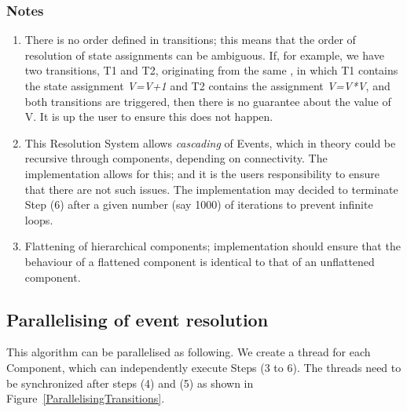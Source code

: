 \documentclass[draftspec]{ninemlspec}
\newcommand{\Regime}{\defRef{\textbf{\class{Regime}}\xspace}{sec:Regime}}
\begin{document}
\subsubsection{Notes}

\begin{enumerate}
\item  There is no order defined in transitions; this means
that the order of resolution of state assignments can be ambiguous. If, for
example, we have two transitions, T1 and T2, originating from the same \Regime,
in which T1 contains the state assignment \textsl{V=V+1} and T2 contains the
assignment \textsl{V=V*V}, and both transitions are triggered, then there is no
guarantee about the value of V. It is up the user to ensure this does not
happen.

\item This Resolution System allows \emph{cascading} of Events, which in theory
could be recursive through components, depending on connectivity. The
implementation allows for this; and it is the users responsibility to ensure
that there are not such issues. The implementation may decided to terminate
Step (6) after a given number (say 1000) of iterations to prevent infinite
loops.

\item Flattening of hierarchical components; implementation should ensure that
the behaviour of a flattened component is identical to that of an unflattened
component.
\end{enumerate}

\subsection{Parallelising of event resolution}

This algorithm can be parallelised as following. We create a thread for each
Component, which can independently execute Steps (3 to 6). The threads need
to be synchronized after steps (4) and (5) as shown in
Figure~\ref{ParallelisingTransitions}.
\end{document}

